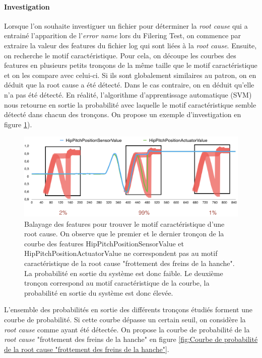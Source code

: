 \paragraph{Investigation}
Lorsque l'on souhaite investiguer un fichier pour déterminer la \emph{root cause} qui a entrainé l'apparition de l'\emph{error name} lors du Filering Test, on commence par extraire la valeur des features du fichier log qui sont liées à la \emph{root cause}. Ensuite, on recherche le motif caractéristique. Pour cela, on découpe les courbes des features en plusieurs petits tronçons de la même taille que le motif caractéristique et on les compare avec celui-ci. Si ils sont globalement similaires au patron, on en déduit que la root cause a été détecté. Dans le cas contraire, on en déduit qu'elle n'a pas été détecté. En réalité, l'algorithme d'apprentissage automatique (SVM) nous retourne en sortie la probabilité avec laquelle le motif caractéristique semble détecté dans chacun des tronçons. On propose un exemple d'investigation en figure \ref{fig:Balayage des features pour retrouver le motif caractéristique d'une root cause}).

\begin{figure}[h]
	\centering\includegraphics[width=12cm]{images/balayage_motif.png}
	\caption[Balayage des features pour retrouver le motif caractéristique d'une root cause]{Balayage des features pour trouver le motif caractéristique d'une root cause. On observe que le premier et le dernier tronçon de la courbe des features HipPitchPositionSensorValue et  HipPitchPositionActuatorValue ne correspondent pas au motif caractéristique de la root cause "frottement des freins de la hanche". La probabilité en sortie du système est donc faible. Le deuxième tronçon correspond au motif caractéristique de la courbe, la probabilité en sortie du système est donc élevée.}
	\label{fig:Balayage des features pour retrouver le motif caractéristique d'une root cause}
\end{figure}

L'ensemble des probabilités en sortie des différents tronçons étudiés forment une courbe de probabilité. Si cette courbe dépasse un certain seuil, on considère la \emph{root cause} comme ayant été détectée. On propose la courbe de probabilité de la \emph{root cause} "frottement des freins de la hanche" en figure \ref{fig:Courbe de probabilité de la root cause "frottement des freins de la hanche"}.

